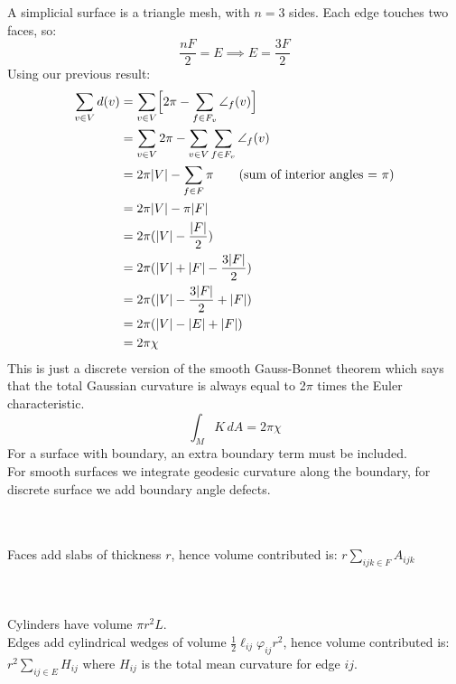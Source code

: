 \documentclass{article}
\newcommand\ifrac[2]{{\displaystyle\frac{#1}{#2}}}
\def\hal{\ifrac{1}{2}}
\begin{document}
\vspace{1.8cm}
\\\\


A simplicial surface is a triangle mesh, with $n=3$ sides.
Each edge touches two faces, so:
$$\ifrac{nF}{2} = E \implies E = \ifrac{3F}{2}$$
Using our previous result:
\begin{align*}
    \sum_{v \in V} d(v) &= \sum_{v \in V} \Bigl[ 2\pi - \sum_{f \in F_v} \angle_f(v) \Bigr] \\
        &= \sum_{v \in V} 2\pi - \sum_{v \in V} \sum_{f \in F_v} \angle_f(v) \\
        &= 2\pi|V| - \sum_{f \in F} \pi \tag*{\text{(sum of interior angles = $\pi$)}} \\
        &= 2\pi|V| - \pi|F| \\
        &= 2\pi(|V| - \frac{|F|}{2}) \\
        &= 2\pi(|V| + |F| - \frac{3|F|}{2}) \\
        &= 2\pi(|V| - \frac{3|F|}{2} + |F|) \\
        &= 2\pi(|V| - |E| + |F|) \\
        &= 2\pi\chi
\end{align*}
This is just a discrete version of the smooth Gauss-Bonnet theorem which says that the total Gaussian curvature
is always equal to 2$\pi$ times the Euler characteristic.
$$
    \int_M K \, dA = 2\pi\chi
$$
For a surface with boundary, an extra boundary term must be included.\\
For smooth surfaces we integrate geodesic curvature along the boundary, for discrete surface we add boundary angle defects.



\pagebreak
{}\\\\


Faces add slabs of thickness $r$, hence volume contributed is: $r \sum_{ijk \in F} A_{ijk}$


\vspace{1.8cm}
\\\\

Cylinders have volume $\pi r^2 L$.\\
Edges add cylindrical wedges of volume $\hal \ell_{ij} \varphi_{ij} r^2$, hence volume contributed is:
$r^2  \sum_{ij \in E} H_{ij}$ where $H_{ij}$ is the total mean curvature for edge $ij$.
\end{document}
